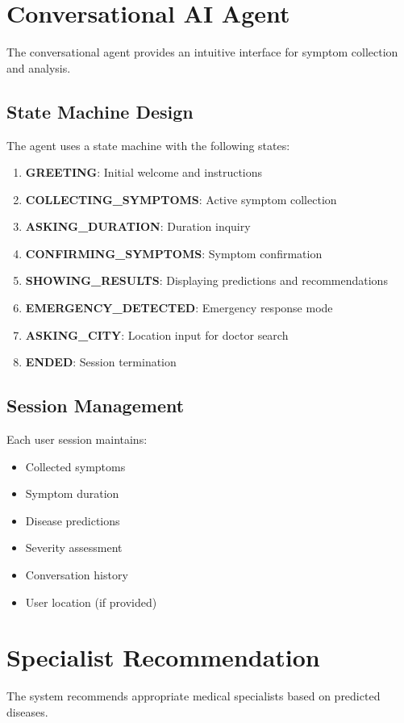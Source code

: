\section{Conversational AI Agent}
The conversational agent provides an intuitive interface for symptom collection and analysis.

\subsection{State Machine Design}
The agent uses a state machine with the following states:

\begin{enumerate}
    \item \textbf{GREETING}: Initial welcome and instructions
    \item \textbf{COLLECTING\_SYMPTOMS}: Active symptom collection
    \item \textbf{ASKING\_DURATION}: Duration inquiry
    \item \textbf{CONFIRMING\_SYMPTOMS}: Symptom confirmation
    \item \textbf{SHOWING\_RESULTS}: Displaying predictions and recommendations
    \item \textbf{EMERGENCY\_DETECTED}: Emergency response mode
    \item \textbf{ASKING\_CITY}: Location input for doctor search
    \item \textbf{ENDED}: Session termination
\end{enumerate}

\subsection{Session Management}
Each user session maintains:

\begin{itemize}
    \item Collected symptoms
    \item Symptom duration
    \item Disease predictions
    \item Severity assessment
    \item Conversation history
    \item User location (if provided)
\end{itemize}

\section{Specialist Recommendation}
The system recommends appropriate medical specialists based on predicted diseases.

